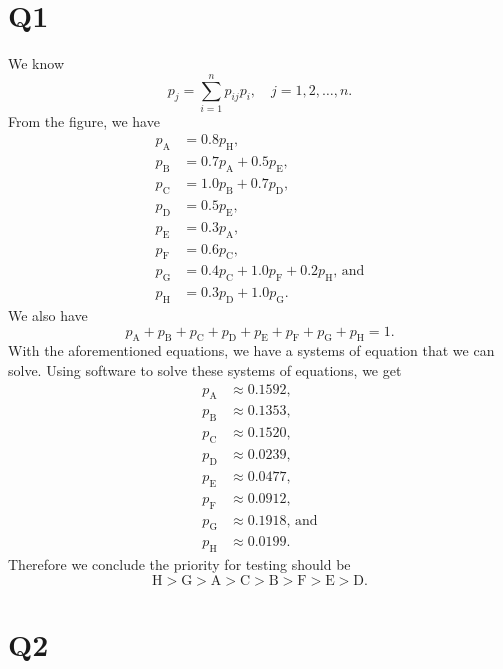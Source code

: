 \documentclass[12pt, letterpaper, titlepage]{article}
\begin{document}
 
\onehalfspacing

\section*{Q1}
We know
\begin{equation}
    p_j = \sum_{i=1}^{n}p_{ij}p_i, \quad j = 1,2,\ldots,n.
\end{equation}
From the figure, we have
\begin{align}
    p_\text{A} &= 0.8p_\text{H}, \\
    p_\text{B} &= 0.7p_\text{A} + 0.5p_\text{E}, \\
    p_\text{C} &= 1.0p_\text{B} + 0.7p_\text{D}, \\
    p_\text{D} &= 0.5p_\text{E}, \\
    p_\text{E} &= 0.3p_\text{A}, \\
    p_\text{F} &= 0.6p_\text{C}, \\
    p_\text{G} &= 0.4p_\text{C} + 1.0p_\text{F} + 0.2p_\text{H} \text{, and} \\
    p_\text{H} &= 0.3p_\text{D}+ 1.0p_\text{G}.
\end{align}
We also have
\begin{equation}
    p_\text{A} +
    p_\text{B} +
    p_\text{C} +
    p_\text{D} +
    p_\text{E} +
    p_\text{F} +
    p_\text{G} +
    p_\text{H} = 1.
\end{equation}
With the aforementioned equations, we have a systems of equation that we can solve. Using software to solve these systems of equations, we get 
\begin{align}
    p_\text{A} &\approx 0.1592, \\
    p_\text{B} &\approx 0.1353, \\
    p_\text{C} &\approx 0.1520, \\
    p_\text{D} &\approx 0.0239, \\
    p_\text{E} &\approx 0.0477, \\
    p_\text{F} &\approx 0.0912, \\
    p_\text{G} &\approx 0.1918 \text{, and} \\
    p_\text{H} &\approx 0.0199.
\end{align}
Therefore we conclude the priority for testing should be
\begin{equation}
    \text{H} > \text{G} > \text{A} > \text{C} > \text{B} > \text{F} > \text{E} > \text{D}.
\end{equation}

\section*{Q2}
\end{document}
